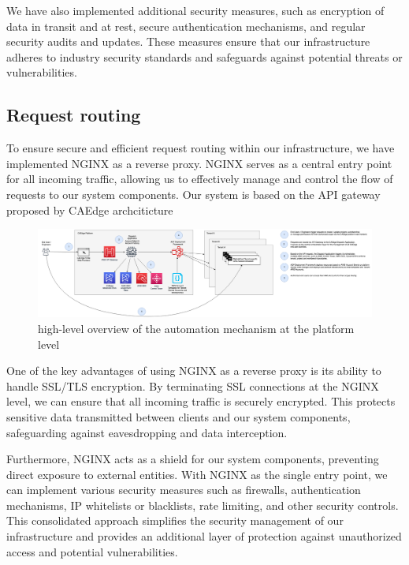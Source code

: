 \documentclass[
12pt,
oneside, 
onehalfspacing, 
nolistspacing, 
parskip, 
chapterinoneline, 
]{AASTCOMPUTER}
\begin{document}
We have also implemented additional security measures, such as encryption of data in transit and at rest, secure authentication mechanisms, and regular security audits and updates. These measures ensure that our infrastructure adheres to industry security standards and safeguards against potential threats or vulnerabilities.

\subsection{Request routing}
To ensure secure and efficient request routing within our infrastructure, we have implemented NGINX as a reverse proxy. NGINX serves as a central entry point for all incoming traffic, allowing us to effectively manage and control the flow of requests to our system components. Our system is based on the API gateway proposed by CAEdge archciticture

\begin{figure}[!ht]
	\centering
	\includegraphics[scale=0.2]{Figures/Architicture/routing.png}
  	\caption{high-level overview of the automation mechanism at the platform level}
  	\label{fig:high-level overview of the automation mechanism at the platform level}
\end{figure}


One of the key advantages of using NGINX as a reverse proxy is its ability to handle SSL/TLS encryption. By terminating SSL connections at the NGINX level, we can ensure that all incoming traffic is securely encrypted. This protects sensitive data transmitted between clients and our system components, safeguarding against eavesdropping and data interception.

Furthermore, NGINX acts as a shield for our system components, preventing direct exposure to external entities. With NGINX as the single entry point, we can implement various security measures such as firewalls, authentication mechanisms, IP whitelists or blacklists, rate limiting, and other security controls. This consolidated approach simplifies the security management of our infrastructure and provides an additional layer of protection against unauthorized access and potential vulnerabilities.
\end{document}
